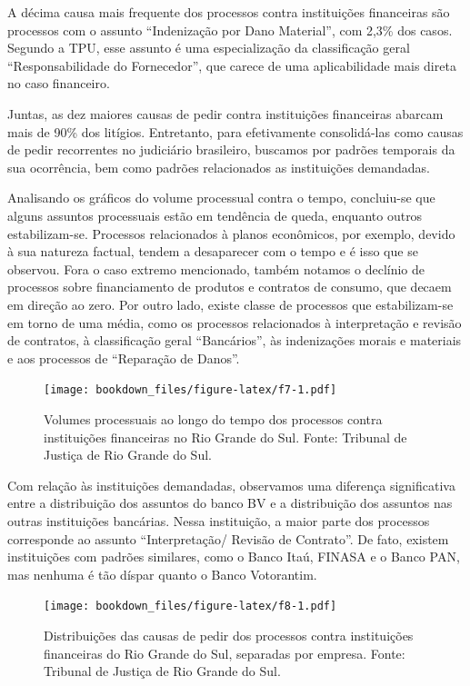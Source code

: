 \documentclass[]{report}
\begin{document}
A décima causa mais frequente dos processos contra instituições
financeiras são processos com o assunto ``Indenização por Dano
Material'', com 2,3\% dos casos. Segundo a TPU, esse assunto é uma
especialização da classificação geral ``Responsabilidade do
Fornecedor'', que carece de uma aplicabilidade mais direta no caso
financeiro.

Juntas, as dez maiores causas de pedir contra instituições financeiras
abarcam mais de 90\% dos litígios. Entretanto, para efetivamente
consolidá-las como causas de pedir recorrentes no judiciário brasileiro,
buscamos por padrões temporais da sua ocorrência, bem como padrões
relacionados as instituições demandadas.

Analisando os gráficos do volume processual contra o tempo, concluiu-se
que alguns assuntos processuais estão em tendência de queda, enquanto
outros estabilizam-se. Processos relacionados à planos econômicos, por
exemplo, devido à sua natureza factual, tendem a desaparecer com o tempo
e é isso que se observou. Fora o caso extremo mencionado, também notamos
o declínio de processos sobre financiamento de produtos e contratos de
consumo, que decaem em direção ao zero. Por outro lado, existe classe de
processos que estabilizam-se em torno de uma média, como os processos
relacionados à interpretação e revisão de contratos, à classificação
geral ``Bancários'', às indenizações morais e materiais e aos processos
de ``Reparação de Danos''.

\begin{figure}[htbp]
\centering
\texttt{[image: bookdown\_files/figure-latex/f7-1.pdf]}
\caption{\label{fig:f7}Volumes processuais ao longo do tempo dos processos
contra instituições financeiras no Rio Grande do Sul. Fonte: Tribunal de
Justiça de Rio Grande do Sul.}
\end{figure}

Com relação às instituições demandadas, observamos uma diferença
significativa entre a distribuição dos assuntos do banco BV e a
distribuição dos assuntos nas outras instituições bancárias. Nessa
instituição, a maior parte dos processos corresponde ao assunto
``Interpretação/ Revisão de Contrato''. De fato, existem instituições
com padrões similares, como o Banco Itaú, FINASA e o Banco PAN, mas
nenhuma é tão díspar quanto o Banco Votorantim.

\begin{figure}[htbp]
\centering
\texttt{[image: bookdown\_files/figure-latex/f8-1.pdf]}
\caption{\label{fig:f8}Distribuições das causas de pedir dos processos
contra instituições financeiras do Rio Grande do Sul, separadas por
empresa. Fonte: Tribunal de Justiça de Rio Grande do Sul.}
\end{figure}
\end{document}
